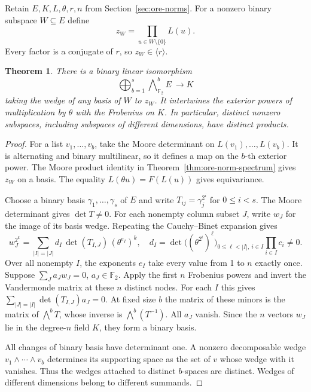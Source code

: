 \documentclass[11pt]{article}
\newtheorem{theorem}{Theorem}
\newcommand{\F}{\mathbb F_2}
\begin{document}
Retain \(E,K,L,\theta,r,n\) from Section~\ref{sec:ore-norms}.
For a nonzero binary subspace \(W\subseteq E\) define
\[
 z_W=\prod_{u\in W\setminus\{0\}}L(u).
\]
Every factor is a conjugate of \(r\), so \(z_W\in\langle r\rangle\).

\begin{theorem}\label{thm:ore-wedge}
There is a binary linear isomorphism
\[
 \bigoplus_{b=1}^s\bigwedge\nolimits^b_{\F} E\ \longrightarrow K
\]
taking the wedge of any basis of \(W\) to \(z_W\).
It intertwines the exterior powers of multiplication by \(\theta\)
with the Frobenius on \(K\). In particular, distinct nonzero subspaces,
including subspaces of different dimensions, have distinct products.
\end{theorem}
\begin{proof}
For a list \(v_1,\ldots,v_b\), take the Moore determinant on
\(L(v_1),\ldots,L(v_b)\). It is alternating and binary multilinear,
so it defines a map on the \(b\)-th exterior power. The Moore product
identity in Theorem~\ref{thm:ore-norm-spectrum} gives \(z_W\) on a basis.
The equality \(L(\theta u)=F(L(u))\) gives equivariance.

Choose a binary basis \(\gamma_1,\ldots,\gamma_s\) of \(E\) and write
\(T_{ij}=\gamma_j^{2^i}\) for \(0\le i<s\).
The Moore determinant gives \(\det T\ne0\).
For each nonempty column subset \(J\), write \(w_J\) for the image
of its basis wedge. Repeating the Cauchy--Binet expansion gives
\[
 w_J^{2^k}=\sum_{|I|=|J|} d_I\,\det(T_{I,J})\,(\theta^{e_I})^k,
 \quad
 d_I=\det\bigl((\theta^{2^i})^\ell\bigr)_{0\le\ell<|I|,\ i\in I}
      \prod_{i\in I}c_i\ne0 .
\]
Over all nonempty \(I\), the exponents \(e_I\) take every value from
1 to \(n\) exactly once. Suppose \(\sum_J a_J w_J=0\), \(a_J\in\F\).
Apply the first \(n\) Frobenius powers and invert the Vandermonde
matrix at these \(n\) distinct nodes. For each \(I\) this gives
\(\sum_{|J|=|I|}\det(T_{I,J})a_J=0\). At fixed size \(b\) the matrix
of these minors is the matrix of \(\bigwedge^b T\), whose inverse is
\(\bigwedge^b(T^{-1})\). All \(a_J\) vanish. Since the \(n\) vectors
\(w_J\) lie in the degree-\(n\) field \(K\), they form a binary basis.

All changes of binary basis have determinant one. A nonzero decomposable
wedge \(v_1\wedge\cdots\wedge v_b\) determines its supporting space as
the set of \(v\) whose wedge with it vanishes. Thus the wedges attached
to distinct \(b\)-spaces are distinct. Wedges of different dimensions belong to
different summands.
\end{proof}
\end{document}
